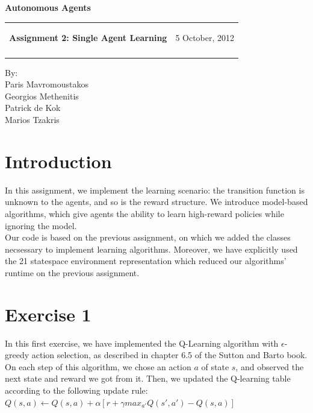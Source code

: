 \documentclass[a4paper,11pt]{article}
\makeatletter
\newcommand{\resheading}[1]{{\large \colorbox{mygrey}{\begin{minipage}{\textwidth}{\textbf{#1 \vphantom{p\^{E}}}}\end{minipage}}}}
\newcommand{\mywebheader}{
  \begin{tabular}{@{}p{5in}p{4in}}
  {\resheading{Assignment 2: Single Agent Learning}} & {\Large 5 October, 2012}\\\vspace{0.2cm}
  \end{tabular}}
\makeatother
\begin{document}
\begin{center}
{\LARGE \textbf{Autonomous Agents}}\\ [1em]
\end{center}
\mywebheader

\begin{center}
{\Large By:} \\ \vspace{0.1cm}
{\Large Paris Mavromoustakos} \\  \vspace{0.1cm}
{\Large Georgios Methenitis} \\ \vspace{0.1cm}
{\Large Patrick de Kok} \\ \vspace{0.1cm}
{\Large Marios Tzakris}
\end{center}




\section*{Introduction}

In this assignment, we implement the learning scenario: the transition function is unknown to the agents, and so is the reward structure. We introduce model-based algorithms, which give agents the ability to learn high-reward policies while ignoring the model.  \\
Our code is based on the previous assignment, on which we added the classes necsessary to implement learning algorithms. Moreover, we have explicitly used the 21 statespace environment representation which reduced our algorithms' runtime on the previous assignment.


\section*{Exercise 1}

In this first exercise, we have implemented the Q-Learning algorithm with $\epsilon$-greedy action selection, as described  in chapter 6.5 of the Sutton and Barto book.\\
On each step of this algorithm, we chose an action $a$ of state $s$, and observed the next state and reward we got from it. Then, we updated the Q-learning table according to the following update rule: \\ 

$Q(s,a) \leftarrow  Q(s,a) + \alpha \left[ r + \gamma  max_{a'} Q(s',a') - Q(s,a)\right]$ \\
\end{document}
